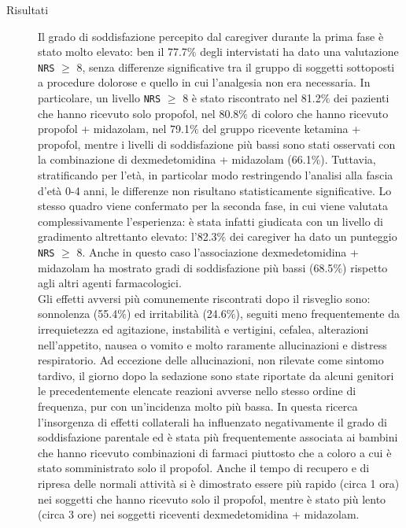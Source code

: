 \begin{description}
\item[Risultati] 
Il grado di soddisfazione percepito dal caregiver durante la prima fase è stato molto elevato: ben il 77.7$\%$ degli intervistati ha dato una valutazione \texttt{NRS} $\geq$ 8, senza differenze significative tra il gruppo di soggetti sottoposti a procedure dolorose e quello in cui l'analgesia non era necessaria. In particolare, un livello \texttt{NRS} $\geq$ 8 è stato riscontrato nel 81.2$\%$ dei pazienti che hanno ricevuto solo propofol, nel 80.8$\%$ di coloro che hanno ricevuto propofol + midazolam, nel 79.1$\%$ del gruppo ricevente ketamina + propofol, mentre i livelli di soddisfazione più bassi sono stati osservati con la combinazione di dexmedetomidina + midazolam (66.1$\%$). Tuttavia, stratificando per l'età, in particolar modo restringendo l'analisi alla fascia d'età 0-4 anni, le differenze non risultano statisticamente significative. Lo stesso quadro viene confermato per la seconda fase, in cui viene valutata complessivamente l'esperienza: è stata infatti giudicata con un livello di gradimento altrettanto elevato: l'82.3$\%$ dei caregiver ha dato un punteggio \texttt{NRS} $\geq$ 8. Anche in questo caso l'associazione dexmedetomidina + midazolam ha mostrato gradi di soddisfazione più bassi (68.5$\%$) rispetto agli altri agenti farmacologici.
\\Gli effetti avversi più comunemente riscontrati dopo il risveglio sono: sonnolenza (55.4$\%$) ed irritabilità (24.6$\%$), seguiti meno frequentemente da irrequietezza ed agitazione, instabilità e vertigini, cefalea, alterazioni nell'appetito, nausea o vomito e molto raramente allucinazioni e distress respiratorio. Ad eccezione delle allucinazioni, non rilevate come sintomo tardivo, il giorno dopo la sedazione sono state riportate da alcuni genitori le precedentemente elencate reazioni avverse nello stesso ordine di frequenza, pur con un'incidenza molto più bassa. In questa ricerca l'insorgenza di effetti collaterali ha influenzato negativamente il grado di soddisfazione parentale ed è stata più frequentemente associata ai bambini che hanno ricevuto combinazioni di farmaci piuttosto che a coloro a cui è stato somministrato solo il propofol. Anche il tempo di recupero e di ripresa delle normali attività si è dimostrato essere più rapido (circa 1 ora) nei soggetti che hanno ricevuto solo il propofol, mentre è stato più lento (circa 3 ore) nei soggetti riceventi dexmedetomidina + midazolam. 

\end{description}
